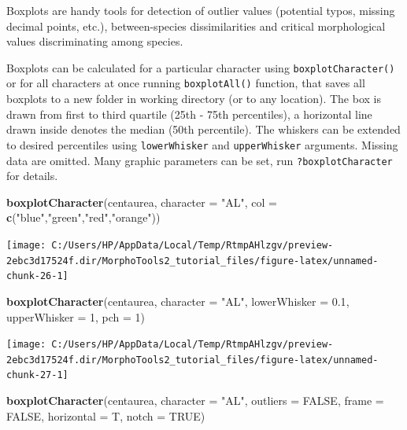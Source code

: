 \documentclass[
]{article}
\newenvironment{Shaded}{\begin{snugshade}}{\end{snugshade}}
\newcommand{\DataTypeTok}[1]{\textcolor[rgb]{0.13,0.29,0.53}{#1}}
\newcommand{\DecValTok}[1]{\textcolor[rgb]{0.00,0.00,0.81}{#1}}
\newcommand{\FloatTok}[1]{\textcolor[rgb]{0.00,0.00,0.81}{#1}}
\newcommand{\KeywordTok}[1]{\textcolor[rgb]{0.13,0.29,0.53}{\textbf{#1}}}
\newcommand{\NormalTok}[1]{#1}
\newcommand{\OtherTok}[1]{\textcolor[rgb]{0.56,0.35,0.01}{#1}}
\newcommand{\StringTok}[1]{\textcolor[rgb]{0.31,0.60,0.02}{#1}}
\begin{document}
Boxplots are handy tools for detection of outlier values (potential
typos, missing decimal points, etc.), between-species dissimilarities
and critical morphological values discriminating among species.

Boxplots can be calculated for a particular character using
\texttt{boxplotCharacter()} or for all characters at once running
\texttt{boxplotAll()} function, that saves all boxplots to a new folder
in working directory (or to any location). The box is drawn from first
to third quartile (25th - 75th percentiles), a horizontal line drawn
inside denotes the median (50th percentile). The whiskers can be
extended to desired percentiles using \texttt{lowerWhisker} and
\texttt{upperWhisker} arguments. Missing data are omitted. Many graphic
parameters can be set, run \texttt{?boxplotCharacter} for details.

\begin{Shaded}
\begin{Highlighting}[]
\KeywordTok{boxplotCharacter}\NormalTok{(centaurea, }\DataTypeTok{character =} \StringTok{"AL"}\NormalTok{, }\DataTypeTok{col =} \KeywordTok{c}\NormalTok{(}\StringTok{"blue"}\NormalTok{,}\StringTok{"green"}\NormalTok{,}\StringTok{"red"}\NormalTok{,}\StringTok{"orange"}\NormalTok{))}
\end{Highlighting}
\end{Shaded}

\begin{center}\texttt{[image: C:/Users/HP/AppData/Local/Temp/RtmpAHlzgv/preview-2ebc3d17524f.dir/MorphoTools2\_tutorial\_files/figure-latex/unnamed-chunk-26-1]} \end{center}

\begin{Shaded}
\begin{Highlighting}[]
\KeywordTok{boxplotCharacter}\NormalTok{(centaurea, }\DataTypeTok{character =} \StringTok{"AL"}\NormalTok{, }\DataTypeTok{lowerWhisker =} \FloatTok{0.1}\NormalTok{, }\DataTypeTok{upperWhisker =} \DecValTok{1}\NormalTok{, }\DataTypeTok{pch =} \DecValTok{1}\NormalTok{)}
\end{Highlighting}
\end{Shaded}

\begin{center}\texttt{[image: C:/Users/HP/AppData/Local/Temp/RtmpAHlzgv/preview-2ebc3d17524f.dir/MorphoTools2\_tutorial\_files/figure-latex/unnamed-chunk-27-1]} \end{center}

\begin{Shaded}
\begin{Highlighting}[]
\KeywordTok{boxplotCharacter}\NormalTok{(centaurea, }\DataTypeTok{character =} \StringTok{"AL"}\NormalTok{, }\DataTypeTok{outliers =} \OtherTok{FALSE}\NormalTok{,}
                 \DataTypeTok{frame =} \OtherTok{FALSE}\NormalTok{, }\DataTypeTok{horizontal =}\NormalTok{ T, }\DataTypeTok{notch =} \OtherTok{TRUE}\NormalTok{)}
\end{Highlighting}
\end{Shaded}
\end{document}

